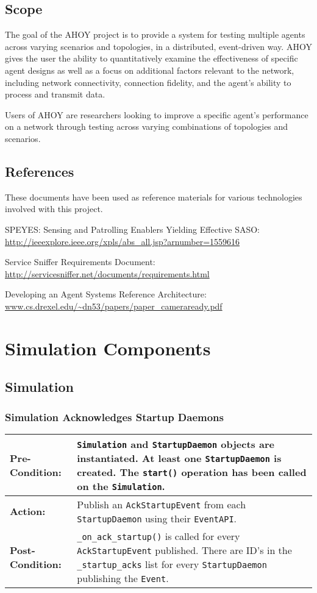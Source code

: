 \documentclass[titlepage]{article}
\renewenvironment{itemize*}
    {\begin{itemize}
        \setlength{\itemsep}{0pt}%
        \setlength{\parskip}{0pt}%
        \setlength{\partopsep}{0pt}%
        \setlength{\topsep}{0pt}}%
    {\end{itemize}}
\newcommand{\testcase}[3]{
    \begin{center}
    \begin{tabular}{| l | p{0.7\textwidth}|}
        \hline
        \rowcolor[gray]{0.8}\textbf{Pre-Condition:} & #1 \\ \hline
        \textbf{Action:} & #2 \\ \hline
        \rowcolor[gray]{0.8}\textbf{Post-Condition:} & #3 \\ \hline
    \end{tabular}
    \end{center}
}
\begin{document}
\subsection{Scope}
The goal of the AHOY project is to provide a system for testing multiple agents across varying scenarios and topologies, in a distributed, event-driven way. AHOY gives the user the ability to quantitatively examine the effectiveness of specific agent designs as well as a focus on additional factors relevant to the network, including network connectivity, connection fidelity, and the agent's ability to process and transmit data.

Users of AHOY are researchers looking to improve a specific agent's performance on a network through testing across varying combinations of topologies and scenarios.

\subsection{References%
  \label{references}%
}

These documents have been used as reference materials for various technologies involved with this project.
%
\begin{itemize*}
	\item SPEYES: Sensing and Patrolling Enablers Yielding Effective SASO: \url{http://ieeexplore.ieee.org/xpls/abs\_all.jsp?arnumber=1559616}
	\item Service Sniffer Requirements Document: \url{http://servicesniffer.net/documents/requirements.html}
    \item Developing an Agent Systems Reference Architecture: \url{www.cs.drexel.edu/~dn53/papers/paper\_cameraready.pdf}
\end{itemize*}

\section{Simulation Components}
\subsection{Simulation}

\subsubsection{Simulation Acknowledges Startup Daemons}

\testcase{\texttt{Simulation} and \texttt{StartupDaemon} objects are instantiated. At least one \texttt{StartupDaemon}
is created. The \texttt{start()} operation has been called on the \texttt{Simulation}. }{Publish an \texttt{AckStartupEvent} from each \texttt{StartupDaemon} using their \texttt{EventAPI}.}{\texttt{\_on\_ack\_startup()} is called for every \texttt{AckStartupEvent} published.  There are ID's in the \texttt{\_startup\_acks} list for every \texttt{StartupDaemon} publishing the \texttt{Event}.}
\end{document}
